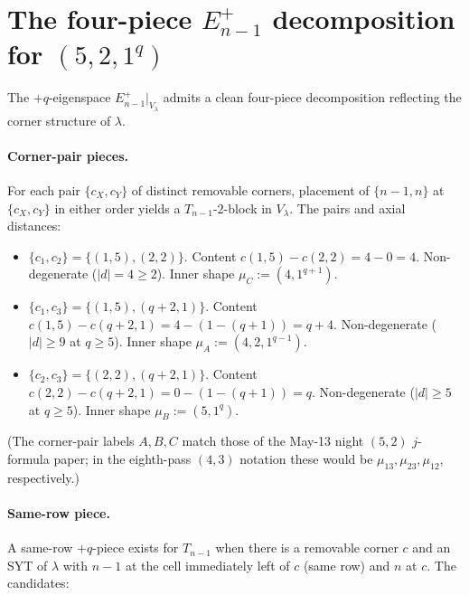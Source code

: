 \documentclass[11pt]{article}
\theoremstyle{definition}
\begin{document}
\section{The four-piece $E^+_{n-1}$ decomposition for $(5,2,1^q)$}\label{sec:Eplus}

The $+q$-eigenspace $E_{n-1}^+|_{V_\lambda}$ admits a clean
four-piece decomposition reflecting the corner structure of $\lambda$.

\paragraph{Corner-pair pieces.}  For each pair $\{c_X, c_Y\}$ of distinct
removable corners, placement of $\{n-1, n\}$ at $\{c_X, c_Y\}$ in either
order yields a $T_{n-1}$-$2$-block in $V_\lambda$.  The pairs and axial
distances:

\begin{itemize}[topsep=0.2em,itemsep=0.1em]
\item $\{c_1, c_2\} = \{(1, 5), (2, 2)\}$.  Content $c(1, 5) - c(2, 2)
   = 4 - 0 = 4$.  Non-degenerate (\(|d| = 4 \ge 2\)).  Inner shape
   $\mu_C := (4, 1^{q+1})$.
\item $\{c_1, c_3\} = \{(1, 5), (q+2, 1)\}$.  Content $c(1, 5) -
   c(q+2, 1) = 4 - (1 - (q+1)) = q + 4$.  Non-degenerate (\(|d| \ge 9\)
   at \(q \ge 5\)).  Inner shape $\mu_A := (4, 2, 1^{q-1})$.
\item $\{c_2, c_3\} = \{(2, 2), (q+2, 1)\}$.  Content $c(2, 2) -
   c(q+2, 1) = 0 - (1 - (q+1)) = q$.  Non-degenerate (\(|d| \ge 5\) at
   \(q \ge 5\)).  Inner shape $\mu_B := (5, 1^q)$.
\end{itemize}

(The corner-pair labels $A, B, C$ match those of the May-13 night
$(5, 2)$ $j$-formula paper; in the eighth-pass $(4, 3)$ notation these
would be $\mu_{13}, \mu_{23}, \mu_{12}$, respectively.)

\paragraph{Same-row piece.}  A same-row $+q$-piece exists for $T_{n-1}$
when there is a removable corner $c$ and an SYT of $\lambda$ with $n-1$
at the cell immediately left of $c$ (same row) and $n$ at $c$.  The
candidates:
\end{document}
